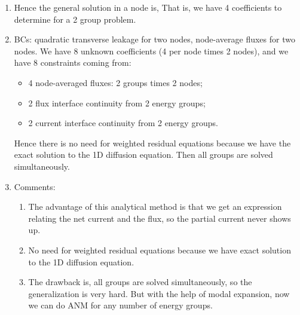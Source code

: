 \documentclass{school-22.211-notes}
\begin{document}
\begin{enumerate}
\item Hence the general solution in a node is, 
     That is, we have 4 coefficients to determine for a 2 group problem. 
     
   \item BCs: quadratic transverse leakage for two nodes, node-average fluxes for two nodes. We have 8 unknown coefficients (4 per node times 2 nodes), and we have 8 constraints coming from: 
     \begin{itemize}
       \item 4 node-averaged fluxes: 2 groups times 2 nodes;
       \item 2 flux interface continuity from 2 energy groups;
       \item 2 current interface continuity from 2 energy groups.
     \end{itemize}
     Hence there is no need for weighted residual equations because we have the exact solution to the 1D diffusion equation. Then all groups are solved simultaneously.

   \item Comments:
     \begin{enumerate}
     \item The advantage of this analytical method is that we get an expression relating the net current and the flux, so the partial current never shows up. 
     \item No need for weighted residual equations because we have exact solution to the 1D diffusion equation. 
     \item The drawback is, all groups are solved simultaneously, so the generalization is very hard. But with the help of modal expansion, now we can do ANM for any number of energy groups.
     \end{enumerate} 
  \end{enumerate}
\end{document}

